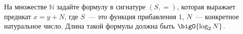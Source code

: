 На множестве $\mathbb{N}$ задайте формулу в сигнатуре $(S, =)$, которая выражает предикат $x = y + N$,
где $S$~--- это функция прибавления $1$, $N$~--- конкретное натуральное число. Длина такой формулы должна
быть $\bigO{\log_2 N}$.
